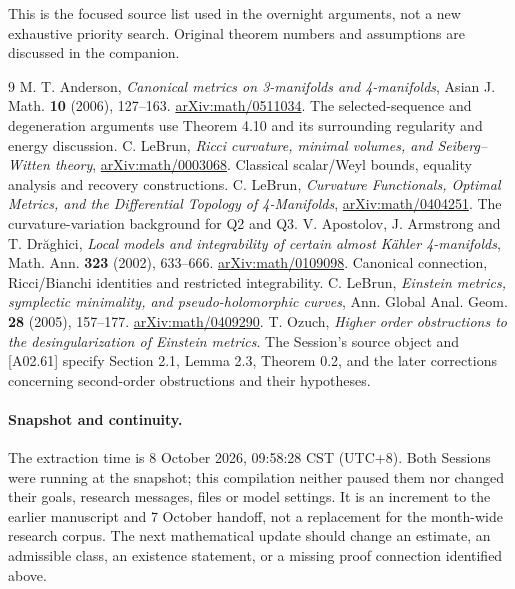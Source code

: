 \documentclass[11pt]{article}
\newcommand{\sref}[1]{\textsf{[#1]}}
\theoremstyle{remark}
\begin{document}
This is the focused source list used in the overnight arguments, not a new
exhaustive priority search. Original theorem numbers and assumptions are
discussed in the companion.
\begin{thebibliography}{9}
M. T. Anderson, \emph{Canonical metrics on 3-manifolds and 4-manifolds},
Asian J. Math. \textbf{10} (2006), 127--163.
\href{https://arxiv.org/abs/math/0511034}{arXiv:math/0511034}.
The selected-sequence and degeneration arguments use Theorem 4.10 and its
surrounding regularity and energy discussion.
C. LeBrun, \emph{Ricci curvature, minimal volumes, and Seiberg--Witten theory},
\href{https://arxiv.org/abs/math/0003068}{arXiv:math/0003068}.
Classical scalar/Weyl bounds, equality analysis and recovery constructions.
C. LeBrun, \emph{Curvature Functionals, Optimal Metrics, and the Differential
Topology of 4-Manifolds},
\href{https://arxiv.org/abs/math/0404251}{arXiv:math/0404251}.
The curvature-variation background for Q2 and Q3.
V. Apostolov, J. Armstrong and T. Dr\u aghici,
\emph{Local models and integrability of certain almost K\"ahler
4-manifolds}, Math. Ann. \textbf{323} (2002), 633--666.
\href{https://arxiv.org/abs/math/0109098}{arXiv:math/0109098}.
Canonical connection, Ricci/Bianchi identities and restricted integrability.
C. LeBrun, \emph{Einstein metrics, symplectic minimality, and
pseudo-holomorphic curves}, Ann. Global Anal. Geom. \textbf{28}
(2005), 157--177.
\href{https://arxiv.org/abs/math/0409290}{arXiv:math/0409290}.
T. Ozuch, \emph{Higher order obstructions to the desingularization of
Einstein metrics}. The Session's source object and \sref{A02.61} specify
Section 2.1, Lemma 2.3, Theorem 0.2, and the later corrections concerning
second-order obstructions and their hypotheses.
\end{thebibliography}

\paragraph{Snapshot and continuity.}
The extraction time is 8 October 2026, 09:58:28 CST (UTC+8).
Both Sessions were running at the snapshot; this compilation neither paused
them nor changed their goals, research messages, files or model settings.
It is an increment to the earlier manuscript and 7 October handoff, not a
replacement for the month-wide research corpus. The next mathematical update
should change an estimate, an admissible class, an existence statement, or a
missing proof connection identified above.
\end{document}

